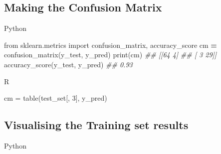 \documentclass[
]{book}
\newenvironment{Shaded}{\begin{snugshade}}{\end{snugshade}}
\newcommand{\BuiltInTok}[1]{#1}
\newcommand{\CommentTok}[1]{\textcolor[rgb]{0.56,0.35,0.01}{\textit{#1}}}
\newcommand{\DecValTok}[1]{\textcolor[rgb]{0.00,0.00,0.81}{#1}}
\newcommand{\FunctionTok}[1]{\textcolor[rgb]{0.00,0.00,0.00}{#1}}
\newcommand{\ImportTok}[1]{#1}
\newcommand{\NormalTok}[1]{#1}
\newcommand{\OperatorTok}[1]{\textcolor[rgb]{0.81,0.36,0.00}{\textbf{#1}}}
\newcommand{\OtherTok}[1]{\textcolor[rgb]{0.56,0.35,0.01}{#1}}
\theoremstyle{definition}
\theoremstyle{definition}
\theoremstyle{definition}
\theoremstyle{definition}
\theoremstyle{remark}
\begin{document}
\hypertarget{making-the-confusion-matrix-1}{%
\subsection{Making the Confusion Matrix}\label{making-the-confusion-matrix-1}}

Python

\begin{Shaded}
\begin{Highlighting}[]
\ImportTok{from}\NormalTok{ sklearn.metrics }\ImportTok{import}\NormalTok{ confusion\_matrix, accuracy\_score}
\NormalTok{cm }\OperatorTok{=}\NormalTok{ confusion\_matrix(y\_test, y\_pred)}
\BuiltInTok{print}\NormalTok{(cm)}
\CommentTok{\#\# [[64  4]}
\CommentTok{\#\#  [ 3 29]]}
\NormalTok{accuracy\_score(y\_test, y\_pred)}
\CommentTok{\#\# 0.93}
\end{Highlighting}
\end{Shaded}

R

\begin{Shaded}
\begin{Highlighting}[]
\NormalTok{cm }\OtherTok{=} \FunctionTok{table}\NormalTok{(test\_set[, }\DecValTok{3}\NormalTok{], y\_pred)}
\end{Highlighting}
\end{Shaded}

\hypertarget{visualising-the-training-set-results-2}{%
\subsection{Visualising the Training set results}\label{visualising-the-training-set-results-2}}

Python
\end{document}

